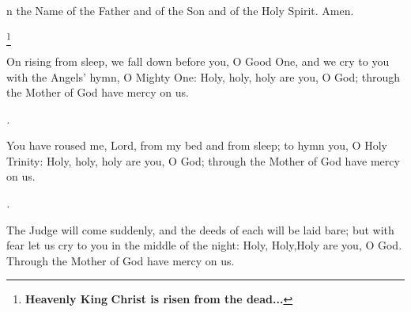 
n the Name of the Father and of the Son and of the Holy Spirit. Amen.

\heavenlyking
\footnote{ \textbf{Heavenly King} \textbf{Christ is risen from the dead...} }


\trisagion


On rising from sleep, we fall down before you, O Good One,
and we cry to you with the Angels' hymn, O Mighty One:
Holy, holy, holy are you, O God;
through the Mother of God have mercy on us.

\textit{\glory.}

You have roused me, Lord, from my bed and from sleep;
to hymn you, O Holy Trinity:
Holy, holy, holy are you, O God;
through the Mother of God have mercy on us.

\textit{\bothnow.}

The Judge will come suddenly, and the deeds of each will be
laid bare;
but with fear let us cry to you in the middle of the night:
Holy, Holy,Holy are you, O God.
Through the Mother of God have mercy on us.\\



\psalmonetwenty

\glorybothnow


\creed

